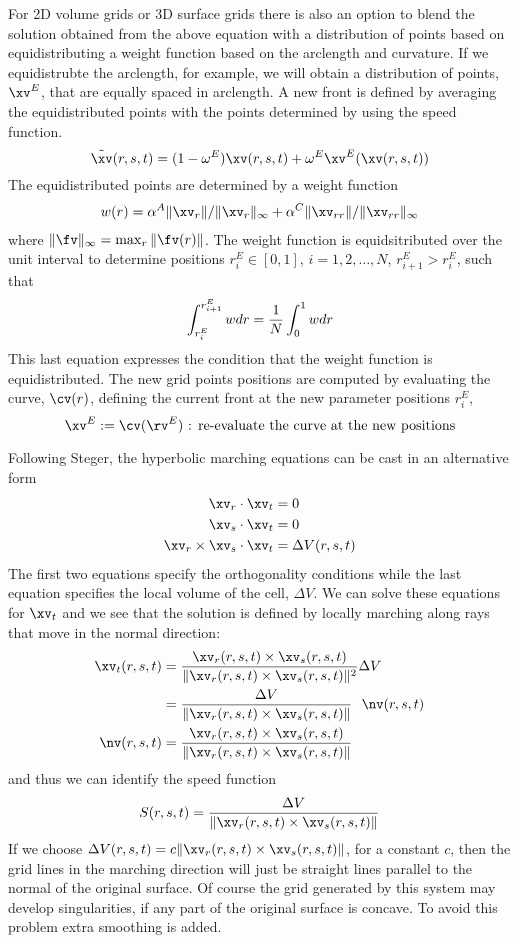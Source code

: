 For 2D volume grids or 3D surface grids 
there is also an option to blend the solution obtained from the above equation with
a distribution of points based on equidistributing a weight function based on the
arclength and curvature. If we equidistrubte the arclength, for example, we will obtain
a distribution of points, $\xv^E$, that are equally spaced in arclength. A new front is defined
by averaging the equidistributed points with the points determined by using the speed function.
\[
  \tilde{\xv}(r,s,t) = (1-\omega^E) \xv(r,s,t) + \omega^E \xv^E(\xv(r,s,t)) 
\]
The equidistributed points are determined by a weight function 
\begin{align*}
    w(r) &= \alpha^A \| \xv_r \| / \| \xv_r \|_\infty + \alpha^C \| \xv_{rr} \| / \| \xv_{rr} \|_\infty \\
\end{align*}
where $\| \fv \|_\infty = \max_r \| \fv(r) \|$.
The weight function is equidsitributed over the unit interval to determine 
positions $r^E_i \in [0,1]$, $i=1,2,\ldots,N$, $r^E_{i+1} > r^E_i$, such that
\[
    \int_{r^E_i}^{r^E_{i+1}} w dr = {1\over N} \int_0^1 w dr
\]
This last equation expresses the condition that the weight function is equidistributed.
The new grid points positions are computed by evaluating the curve, $\cv(r)$, defining the
current front at the new parameter positions $r^E_i$,
\[
    \xv^E := \cv( \rv^E ) \cc{re-evaluate the curve at the new positions}
\]


Following Steger, the hyperbolic marching equations can be cast in an alternative form 
\begin{align}
   \xv_r \cdot \xv_t & = 0 \\
   \xv_s \cdot \xv_t & = 0 \\
   \xv_r \times \xv_s \cdot \xv_t & = \Delta V(r,s,t)  
\end{align}   
The first two equations specify the orthogonality conditions while the 
last equation specifies the local volume of the cell, $\Delta V$.
We can solve these equations for $\xv_t$ and we see that the solution is defined by locally
marching along rays that move in the normal direction:
\begin{align*}
  \xv_t(r,s,t) & = {\xv_r(r,s,t) \times \xv_s(r,s,t) \over \| \xv_r(r,s,t) \times \xv_s(r,s,t) \|^2} \Delta V \\
               & = {\Delta V  \over \| \xv_r(r,s,t) \times \xv_s(r,s,t) \| } ~~ \nv(r,s,t)\\
   \nv(r,s,t) & = {\xv_r(r,s,t) \times \xv_s(r,s,t) \over \| \xv_r(r,s,t) \times \xv_s(r,s,t) \|} \label{hype2}
\end{align*} 
and thus we can identify the speed function
\[
    S(r,s,t) = {\Delta V  \over \| \xv_r(r,s,t) \times \xv_s(r,s,t) \| }
\]
If we choose $\Delta V(r,s,t)= c \| \xv_r(r,s,t) \times \xv_s(r,s,t) \|$, for a constant $c$,
then the grid lines in the marching direction will just be straight lines parallel to the 
normal of the original surface.
Of course the grid generated by this system may develop singularities, if any part
of the original surface is concave. To avoid this problem extra smoothing is added.

